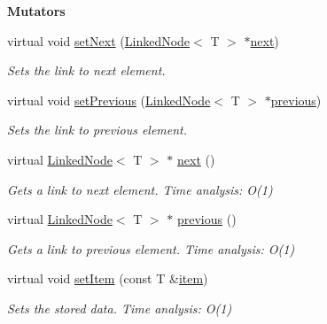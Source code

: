 \begin{Indent}{\bf Mutators}\par
\begin{DoxyCompactItemize}
\item 
virtual void \hyperlink{classedi_1_1LinkedNode_aab46adf9737238cad931690cc34ed570}{set\+Next} (\hyperlink{classedi_1_1LinkedNode}{Linked\+Node}$<$ T $>$ $\ast$\hyperlink{classedi_1_1LinkedNode_a86170b1d8ac57d1cf1833582ee20d430}{next})
\begin{DoxyCompactList}\small\item\em Sets the link to next element. \end{DoxyCompactList}\item 
virtual void \hyperlink{classedi_1_1LinkedNode_a5b03ac16df40e909ad528eda6ac80064}{set\+Previous} (\hyperlink{classedi_1_1LinkedNode}{Linked\+Node}$<$ T $>$ $\ast$\hyperlink{classedi_1_1LinkedNode_aa3dff6aa75b3f2a61d2f3f63a7e56298}{previous})
\begin{DoxyCompactList}\small\item\em Sets the link to previous element. \end{DoxyCompactList}\item 
virtual \hyperlink{classedi_1_1LinkedNode}{Linked\+Node}$<$ T $>$ $\ast$ \hyperlink{classedi_1_1LinkedNode_a117ff973562fc98074a16b9869f7cfc9}{next} ()
\begin{DoxyCompactList}\small\item\em Gets a link to next element. Time analysis\+: O(1) \end{DoxyCompactList}\item 
virtual \hyperlink{classedi_1_1LinkedNode}{Linked\+Node}$<$ T $>$ $\ast$ \hyperlink{classedi_1_1LinkedNode_a3684b801e3616eec2ceaa36082078cf1}{previous} ()
\begin{DoxyCompactList}\small\item\em Gets a link to previous element. Time analysis\+: O(1) \end{DoxyCompactList}\item 
virtual void \hyperlink{classedi_1_1LinkedNode_a242bc7398a286f12ea7a1aa964c49415}{set\+Item} (const T \&\hyperlink{classedi_1_1LinkedNode_aac54788675e672b5a9ae85a83890dda8}{item})
\begin{DoxyCompactList}\small\item\em Sets the stored data. Time analysis\+: O(1) \end{DoxyCompactList}\end{DoxyCompactItemize}
\end{Indent}


